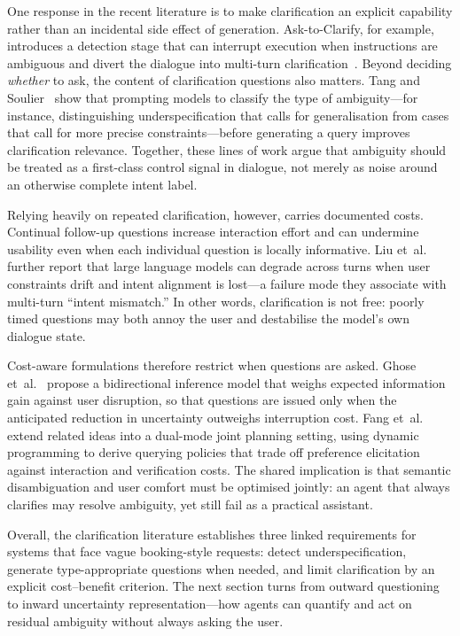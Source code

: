 One response in the recent literature is to make clarification an explicit capability rather than an incidental side effect of generation.
Ask-to-Clarify, for example, introduces a detection stage that can interrupt execution when instructions are ambiguous and divert the dialogue into multi-turn clarification~\cite{lin_ask-to-clarify_2025}.
Beyond deciding \emph{whether} to ask, the content of clarification questions also matters.
Tang and Soulier~\cite{tang_clarifying_2025} show that prompting models to classify the type of ambiguity---for instance, distinguishing underspecification that calls for generalisation from cases that call for more precise constraints---before generating a query improves clarification relevance.
Together, these lines of work argue that ambiguity should be treated as a first-class control signal in dialogue, not merely as noise around an otherwise complete intent label.

Relying heavily on repeated clarification, however, carries documented costs.
Continual follow-up questions increase interaction effort and can undermine usability even when each individual question is locally informative.
Liu et~al.~\cite{liu_intent_2026} further report that large language models can degrade across turns when user constraints drift and intent alignment is lost---a failure mode they associate with multi-turn ``intent mismatch.''
In other words, clarification is not free: poorly timed questions may both annoy the user and destabilise the model's own dialogue state.

Cost-aware formulations therefore restrict when questions are asked.
Ghose et~al.~\cite{ghose_open-ended_2025} propose a bidirectional inference model that weighs expected information gain against user disruption, so that questions are issued only when the anticipated reduction in uncertainty outweighs interruption cost.
Fang et~al.~\cite{fang_uncertainty_2026} extend related ideas into a dual-mode joint planning setting, using dynamic programming to derive querying policies that trade off preference elicitation against interaction and verification costs.
The shared implication is that semantic disambiguation and user comfort must be optimised jointly: an agent that always clarifies may resolve ambiguity, yet still fail as a practical assistant.

Overall, the clarification literature establishes three linked requirements for systems that face vague booking-style requests: detect underspecification, generate type-appropriate questions when needed, and limit clarification by an explicit cost--benefit criterion.
The next section turns from outward questioning to inward uncertainty representation---how agents can quantify and act on residual ambiguity without always asking the user.
